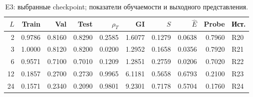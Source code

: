 \begin{table}[H]\centering\scriptsize
\setlength{\tabcolsep}{4pt}
\caption{E3: выбранные checkpoint; показатели обучаемости и выходного представления.}\label{tab:depths}
\begin{tabular}{rrrrrrrrrl}
\toprule
$L$ & Train & Val & Test & $\rho_T$ & GI & $S$ & $\hat E$ & Probe & Ист. \\
\midrule
2 & 0.9786 & 0.8160 & 0.8290 & 0.2585 & 1.6077 & 0.1279 & 0.0638 & 0.7960 & R20 \\
3 & 1.0000 & 0.8120 & 0.8200 & 0.0200 & 1.2952 & 0.1658 & 0.0356 & 0.7920 & R21 \\
6 & 0.9571 & 0.7100 & 0.7010 & 0.1209 & 1.2851 & 0.2759 & 0.0206 & 0.7020 & R22 \\
12 & 0.1857 & 0.2700 & 0.2730 & 0.9965 & 6.1181 & 0.5658 & 0.6793 & 0.2100 & R23 \\
24 & 0.1571 & 0.2340 & 0.2090 & 0.9801 & 9.2301 & 0.7178 & 0.5704 & 0.1760 & R24 \\
\bottomrule
\end{tabular}
\end{table}
